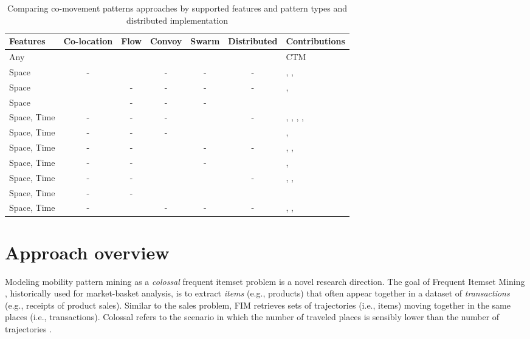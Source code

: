 \documentclass[preprint,12pt,authoryear]{elsarticle} %
\newcommand{\cmark}{\ding{51}}%
\begin{document}
\begin{table}[t]
\centering
\scriptsize
\caption{Comparing co-movement patterns approaches by supported features and pattern types and distributed implementation}
\label{tab:related}
\begin{tabular}{lcccccp{4cm}}
\toprule
Features & Co-location & Flow & Convoy & Swarm & Distributed & Contributions \\
\midrule
Any & \cmark & \cmark & \cmark & \cmark & \cmark & CTM \\
Space & - & \cmark & - & - & - & \cite{DBLP:conf/mdm/SilvaLMZC20}, \cite{yang2021scpm}, \cite{tritsarolis2021online} \\
Space & \cmark & - & - & - & - & \cite{lv2019discovering}, \cite{tran2021spatial} \\
Space & \cmark & - & - & - & \cmark & \cite{fonseca2022multi} \\
Space, Time & - & - & - & \cmark & - & \cite{DBLP:conf/sigmod/LeeHW07}, \cite{DBLP:journals/pvldb/LiDHK10}, \cite{DBLP:journals/tkde/HanLO17}, \cite{ailin2019movement}, \cite{li2023relaxed} \\
Space, Time & - & - & - & \cmark & \cmark & \cite{DBLP:conf/icnc/HuKLZ15}, \cite{tampakis2019scalable} \\
Space, Time & - & - & \cmark & - & - & \cite{DBLP:conf/ssdbm/AungT10}, \cite{DBLP:journals/pvldb/OrakzaiCP19}, \cite{DBLP:conf/cikm/Liu0LLYW21} \\
Space, Time & - & - & \cmark & - & \cmark & \cite{DBLP:journals/geoinformatica/OrakzaiPC21}, \cite{tritsarolis2022predicting} \\
Space, Time & - & - & \cmark & \cmark & - & \cite{DBLP:journals/dke/LiBK15}, \cite{DBLP:journals/ijitdm/PhanPT16}, \cite{helmi2020multiscale} \\
Space, Time & - & - & \cmark & \cmark & \cmark & \cite{DBLP:journals/pvldb/FanZWT16} \\
Space, Time & - & \cmark & - & - & - & \cite{DBLP:journals/tmc/HanLO15}, \cite{DBLP:journals/tits/KumarWRLKP18}, \cite{DBLP:journals/pvldb/WangBCSQ19} \\
\bottomrule
\end{tabular}
\end{table}

\section{Approach overview}
\label{sec:Overview}

Modeling mobility pattern mining as a \textit{colossal} frequent itemset problem is a novel research direction. 
The goal of Frequent Itemset Mining \citep{DBLP:conf/vldb/AgrawalS94}, historically used for market-basket analysis, is to extract \textit{items} (e.g., products) that often appear together in a dataset of \textit{transactions} (e.g., receipts of product sales). 
Similar to the sales problem, FIM retrieves sets of trajectories (i.e., items) moving together in the same places (i.e., transactions). 
Colossal refers to the scenario in which the number of traveled places is sensibly lower than the number of trajectories \citep{DBLP:conf/kdd/PanCTYZ03}.
\end{document}
